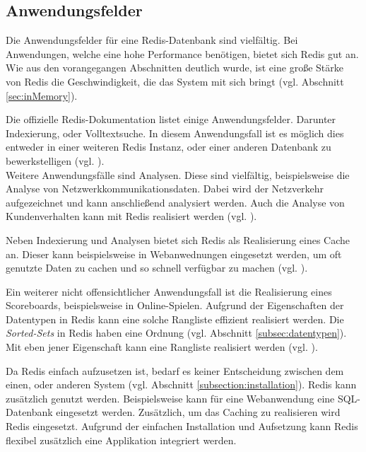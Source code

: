 
\subsection{Anwendungsfelder}
Die Anwendungsfelder für eine \acs{Redis}-Datenbank sind vielfältig. Bei Anwendungen, welche eine hohe Performance benötigen, bietet sich \acs{Redis} gut an. Wie aus den vorangegangen Abschnitten deutlich wurde, ist eine große Stärke von \acs{Redis} die Geschwindigkeit, die das System mit sich bringt (vgl. Abschnitt \ref{sec:inMemory}).

Die offizielle \acs{Redis}-Dokumentation listet einige Anwendungsfelder. Darunter Indexierung, oder Volltextsuche. In diesem Anwendungsfall ist es möglich dies entweder in einer weiteren \acs{Redis} Instanz, oder einer anderen Datenbank zu bewerkstelligen (vgl. \cite{Redis-Docs-Anwen}).
\\Weitere Anwendungsfälle sind Analysen. Diese sind vielfältig, beispielsweise die Analyse von Netzwerkkommunikationsdaten. Dabei wird der Netzverkehr aufgezeichnet und kann anschließend analysiert werden. Auch die Analyse von Kundenverhalten kann mit \acs{Redis} realisiert werden (vgl. \cite{Redis-Docs-Anwen}).

Neben Indexierung und Analysen bietet sich \acs{Redis} als Realisierung eines Cache an. Dieser kann beispielsweise in Webanwednungen eingesetzt werden, um oft genutzte Daten zu cachen und so schnell verfügbar zu machen (vgl. \cite{Redis-Docs-cache}).

Ein weiterer nicht offensichtlicher Anwendungsfall ist die Realisierung eines Scoreboards, beispielsweise in Online-Spielen. Aufgrund der Eigenschaften der Datentypen in \acs{Redis} kann eine solche Rangliste effizient realisiert werden. Die \textit{Sorted-Sets} in \acs{Redis} haben eine Ordnung (vgl. Abschnitt \ref{subsec:datentypen}). Mit eben jener Eigenschaft kann eine Rangliste realisiert werden (vgl. \cite{Redis-Docs-leaderboard}).

Da \acs{Redis} einfach aufzusetzen ist, bedarf es keiner Entscheidung zwischen dem einen, oder anderen System (vgl. Abschnitt \ref{subsection:installation}). \acs{Redis} kann zusätzlich genutzt werden. Beispielsweise kann für eine Webanwendung eine SQL-Datenbank eingesetzt werden. Zusätzlich, um das Caching zu realisieren wird \acs{Redis} eingesetzt. Aufgrund der einfachen Installation und Aufsetzung kann \acs{Redis} flexibel zusätzlich eine Applikation integriert werden.
